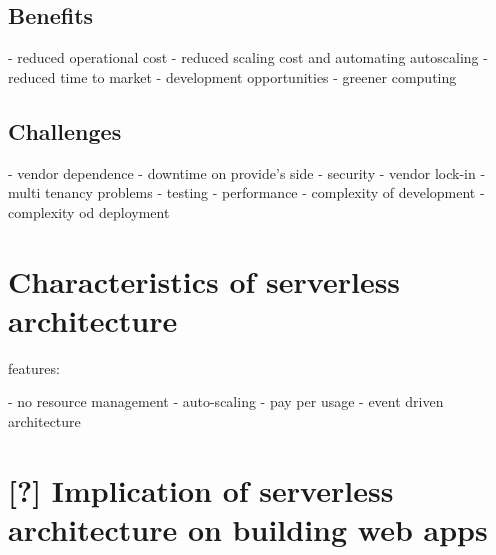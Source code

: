 \subsection*{Benefits}

- reduced operational cost
- reduced scaling cost and automating autoscaling
- reduced time to market
- development opportunities
- greener computing

\subsection*{Challenges}

- vendor dependence - downtime on provide's side
- security
- vendor lock-in
- multi tenancy problems
- testing
- performance
- complexity of development
- complexity od deployment

\section*{Characteristics of serverless architecture}

features:

- no resource management
- auto-scaling
- pay per usage
- event driven architecture

\section*{[?] Implication of serverless architecture on building web apps}